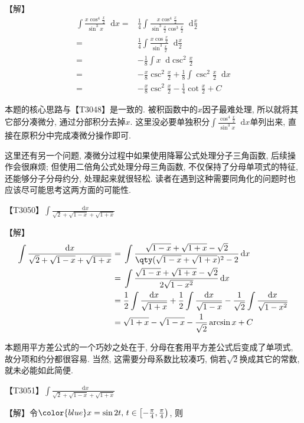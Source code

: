 \documentclass{ctexbook}
\newcommand*{\dif}{\mathop{}\!\mathrm{d}}
\begin{document}
{【解】
\begin{align*}
\int\frac{x\cos^{4}{\frac{x}{2}}}{\sin^{3}{x}}\dif{x}={}&\frac{1}{4}\int\frac{x\cos^{4}{\frac{x}{2}}}{\sin^{3}{\frac{x}{2}}\cos^{3}{\frac{x}{2}}}\dif{\frac{x}{2}}\\
={}&\frac{1}{4}\int\frac{x\cos{\frac{x}{2}}}{\sin^{3}{\frac{x}{2}}}\dif{\frac{x}{2}}\\
={}&-\frac{1}{8}\int x\dif{\csc^{2}{\frac{x}{2}}}\\
={}&-\frac{x}{8}\csc^{2}{\frac{x}{2}}+\frac{1}{8}\int\csc^{2}{\frac{x}{2}}\dif{x}\\
={}&-\frac{x}{8}\csc^{2}{\frac{x}{2}}-\frac{1}{4}\cot{\frac{x}{2}}+C
\end{align*}\par
{\kaishu 本题的核心思路与【T3048】是一致的. 被积函数中的$x$因子最难处理, 所以就将其它部分凑微分, 通过分部积分去掉$x$. 这里没必要单独积分$\int\frac{\cos^{4}{\frac{x}{2}}}{\sin^{3}{x}}\dif{x}$单列出来, 直接在原积分中完成凑微分操作即可. \par
这里还有另一个问题, 凑微分过程中如果使用降幂公式处理分子三角函数, 后续操作会很麻烦; 但使用二倍角公式处理分母三角函数, 不仅保持了分母单项式的特征, 还能够分子分母约分, 处理起来就很轻松. 读者在遇到这种需要同角化的问题时也应该尽可能思考这两方面的可能性. \par}
{\color{red}【T3050】}$\int\frac{\dif{x}}{\sqrt{2}+\sqrt{1-x}+\sqrt{1+x}}$\par
【解】
\begin{align*}
\int\frac{\dif{x}}{\sqrt{2}+\sqrt{1-x}+\sqrt{1+x}}={}&\int\frac{\sqrt{1-x}+\sqrt{1+x}-\sqrt{2}}{\qty(\sqrt{1-x}+\sqrt{1+x})^{2}-2}\dif{x}\\
={}&\int\frac{\sqrt{1-x}+\sqrt{1+x}-\sqrt{2}}{2\sqrt{1-x^{2}}}\dif{x}\\
={}&\frac{1}{2}\int\frac{\dif{x}}{\sqrt{1+x}}+\frac{1}{2}\int\frac{\dif{x}}{\sqrt{1-x}}-\frac{1}{\sqrt{2}}\int\frac{\dif{x}}{\sqrt{1-x^{2}}}\\
={}&\sqrt{1+x}-\sqrt{1-x}-\frac{1}{\sqrt{2}}\arcsin{x}+C
\end{align*}\par
{\kaishu 本题用平方差公式的一个巧妙之处在于, 分母在套用平方差公式后变成了单项式, 故分项和约分都很容易. 当然, 这需要分母系数比较凑巧, 倘若$\sqrt{2}$换成其它的常数, 就未必能如此简便. \par}
{\color{red}【T3051】}$\int\frac{\dif{x}}{\sqrt{2}+\sqrt{1-x}+\sqrt{1+x}}$\par
【解】令$\color{blue}x=\sin{2t},\,t\in\left[-\frac{\pi}{4},\frac{\pi}{4}\right)$, 则
\begin{align*}

\end{align*}}
\end{document}
